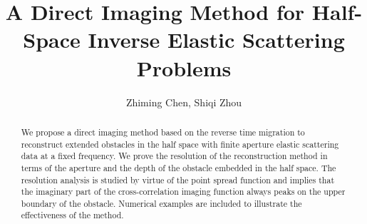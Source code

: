 \documentclass[12pt]{iopart}
\begin{document}

\def\debproof{\noindent {\bf Proof.} }
\def\finproof{\hfill {\small $\Box$} \\}
\makeatletter %
\makeatother  %
\renewcommand\theequation{{\thesection}.{\arabic{equation}}}

\title[]{A Direct Imaging Method for Half-Space Inverse Elastic Scattering Problems}
\author{ Zhiming Chen, Shiqi Zhou}
\address{LSEC, Academy of
	Mathematics and Systems Science, Chinese Academy of Sciences,
	Beijing 100190, China and School of Mathematical Science, University of
        Chinese Academy of Sciences, Beijing 100049, China.}

\begin{abstract}
	We propose a direct imaging method based on the reverse time migration to reconstruct extended
	obstacles in the half space with finite aperture elastic scattering data at a fixed
	frequency. We prove the resolution of the reconstruction method in terms of the
	aperture and the depth of the obstacle embedded in the half space. The resolution
	analysis is studied by virtue of the point spread function and implies that the imaginary 
	part of the cross-correlation imaging function
	always peaks on the upper boundary of the obstacle. Numerical examples
	are included to illustrate the effectiveness of the method. 
\end{abstract}

\maketitle

\newcommand{\eps}{\varepsilon}
\newcommand{\RR}{\mathcal{R}}
\newtheorem{lem}{Lemma}[section]
\newtheorem{prop}{Proposition}[section]
\newtheorem{cor}{Corollary}[section]
\newtheorem{thm}{Theorem}[section]
\newtheorem{rem}{Remark}[section]
\newtheorem{alg}{Algorithm}[section]
\newtheorem{assum}{Assumption}[section]
\newtheorem{definition}{Definition}[section]


\newcommand{\MyRoman}[1]{\rm\setcounter{RomanNumber}{#1}\Roman{RomanNumber}}
\end{document}
